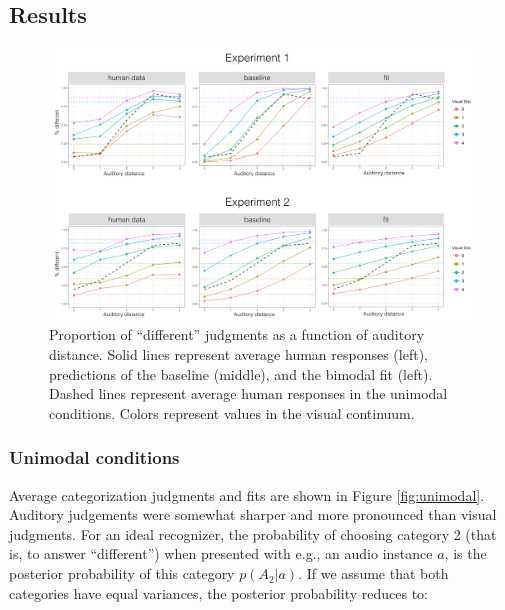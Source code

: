\documentclass[10pt,letterpaper]{article}
\begin{document}
\subsection{Results}
%

\begin{figure}[t]
\centering
\includegraphics[width=.83\textwidth]{Exp.png}
\caption{Proportion of ``different'' judgments as a function of auditory distance. Solid lines represent average human responses (left), predictions of the baseline (middle), and the bimodal fit (left). Dashed lines represent average human responses in the unimodal conditions. Colors represent values in the visual continuum.}
\label{fig:Exp}
\end{figure}

\subsubsection{Unimodal conditions}

Average categorization judgments and fits are shown in Figure \ref{fig:unimodal}. Auditory judgements were somewhat sharper and more pronounced than visual judgments. For an ideal recognizer, the probability of choosing category 2 (that is, to answer ``different'') when presented with e.g., an audio instance $a$, is the posterior probability of this category $p(A_2|a)$. If we assume that both categories have equal variances, the posterior probability reduces to:
\end{document}
